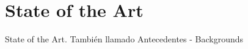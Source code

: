 \chapter{State of the Art} %
\label{chap:state_of_the_art}

State of the Art. También llamado
Antecedentes - Backgrounds






